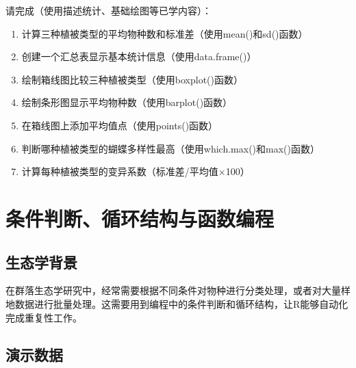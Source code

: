 \documentclass[
  twoside]{book}
\begin{document}
请完成（使用描述统计、基础绘图等已学内容）：

\begin{enumerate}
\def\labelenumi{\arabic{enumi}.}
\item
  计算三种植被类型的平均物种数和标准差（使用mean()和sd()函数）
\item
  创建一个汇总表显示基本统计信息（使用data.frame()）
\item
  绘制箱线图比较三种植被类型（使用boxplot()函数）
\item
  绘制条形图显示平均物种数（使用barplot()函数）
\item
  在箱线图上添加平均值点（使用points()函数）
\item
  判断哪种植被类型的蝴蝶多样性最高（使用which.max()和max()函数）
\item
  计算每种植被类型的变异系数（标准差/平均值×100）
\end{enumerate}

\hypertarget{ux6761ux4ef6ux5224ux65adux5faaux73afux7ed3ux6784ux4e0eux51fdux6570ux7f16ux7a0b}{%
\section{条件判断、循环结构与函数编程}\label{ux6761ux4ef6ux5224ux65adux5faaux73afux7ed3ux6784ux4e0eux51fdux6570ux7f16ux7a0b}}

\hypertarget{ux751fux6001ux5b66ux80ccux666f-7}{%
\subsection{生态学背景}\label{ux751fux6001ux5b66ux80ccux666f-7}}

在群落生态学研究中，经常需要根据不同条件对物种进行分类处理，或者对大量样地数据进行批量处理。这需要用到编程中的条件判断和循环结构，让R能够自动化完成重复性工作。

\hypertarget{ux6f14ux793aux6570ux636e-6}{%
\subsection{演示数据}\label{ux6f14ux793aux6570ux636e-6}}
\end{document}
